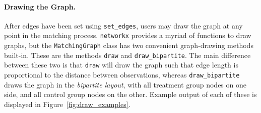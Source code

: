 \documentclass[11pt]{extarticle}
\begin{document}
\paragraph{Drawing the Graph.} After edges have been set using \texttt{set\_edges}, users may draw the graph at any point in the matching process. \texttt{networkx} provides a myriad of functions to draw graphs, but the \texttt{MatchingGraph} class has two convenient graph-drawing methods built-in. These are the methods \texttt{draw} and \texttt{draw\_bipartite}. The main difference between these two is that \texttt{draw} will draw the graph such that edge length is proportional to the distance between observations, whereas \texttt{draw\_bipartite} draws the graph in the \emph{bipartite layout}, with all treatment group nodes on one side, and all control group nodes on the other. Example output of each of these is displayed in Figure~\ref{fig:draw_examples}.
\end{document}
